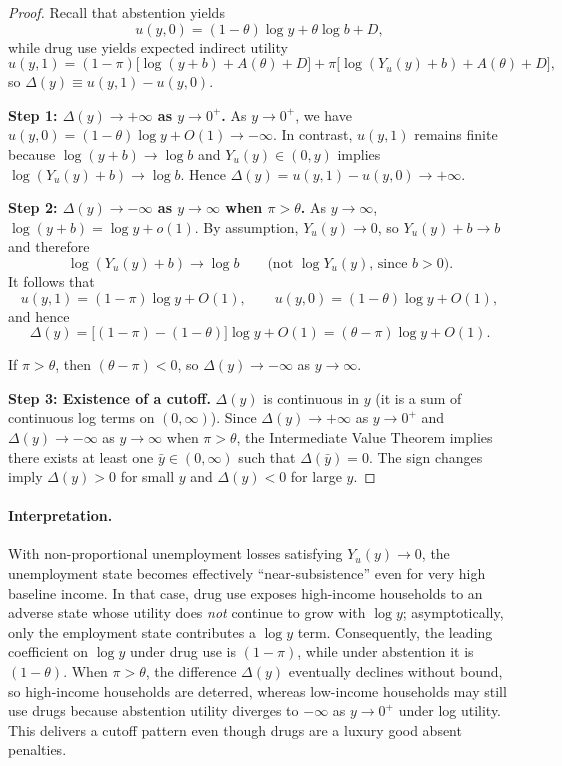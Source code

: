 \documentclass[parskip=full]{article}
\theoremstyle{plain}      %
\theoremstyle{remark}    %
\begin{document}
\begin{proof}
Recall that abstention yields
\[u(y,0)=(1-\theta)\log y+\theta\log b + D,\]
while drug use yields expected indirect utility
\[u(y,1)=(1-\pi)\big[\log(y+b)+A(\theta)+D\big] +\pi\big[\log(Y_u(y)+b)+A(\theta)+D\big],\]
so $\Delta(y)\equiv u(y,1)-u(y,0)$.

\smallskip
\noindent\textbf{Step 1: $\Delta(y)\to +\infty$ as $y\to 0^+$.}
As $y\to 0^+$, we have $u(y,0)=(1-\theta)\log y + O(1)\to -\infty$.
In contrast, $u(y,1)$ remains finite because $\log(y+b)\to\log b$ and $Y_u(y)\in(0,y)$ implies
$\log(Y_u(y)+b)\to \log b$. Hence $\Delta(y)=u(y,1)-u(y,0)\to +\infty$.

\smallskip
\noindent\textbf{Step 2: $\Delta(y)\to -\infty$ as $y\to\infty$ when $\pi>\theta$.}
As $y\to\infty$, $\log(y+b)=\log y+o(1)$.
By assumption, $Y_u(y)\to 0$, so $Y_u(y)+b\to b$ and therefore
\[\log(Y_u(y)+b)\to \log b \qquad \text{(not $\log Y_u(y)$, since $b>0$).}\]
It follows that
\[u(y,1)=(1-\pi)\log y + O(1), \qquad u(y,0)=(1-\theta)\log y + O(1),\]
and hence
\[\Delta(y)=\big[(1-\pi)-(1-\theta)\big]\log y + O(1)=(\theta-\pi)\log y + O(1).\]

If $\pi>\theta$, then $(\theta-\pi)<0$, so $\Delta(y)\to -\infty$ as $y\to\infty$.

\smallskip
\noindent\textbf{Step 3: Existence of a cutoff.}
$\Delta(y)$ is continuous in $y$ (it is a sum of continuous log terms on $(0,\infty)$). Since $\Delta(y)\to +\infty$ as $y\to 0^+$ and $\Delta(y)\to -\infty$ as $y\to\infty$ when $\pi>\theta$, the Intermediate Value Theorem implies there exists at least one $\bar y\in(0,\infty)$ such that $\Delta(\bar y)=0$. The sign changes imply $\Delta(y)>0$ for small $y$ and $\Delta(y)<0$ for large $y$.
\end{proof}

\paragraph{Interpretation.}
With non-proportional unemployment losses satisfying $Y_u(y)\to 0$, the unemployment state becomes effectively ``near-subsistence'' even for very high baseline income. In that case, drug use exposes high-income households
to an adverse state whose utility does \emph{not} continue to grow with $\log y$; asymptotically, only the employment state contributes a $\log y$ term. Consequently, the leading coefficient on $\log y$ under drug use is $(1-\pi)$, while under abstention it is $(1-\theta)$. When $\pi>\theta$, the difference $\Delta(y)$ eventually declines without bound, so high-income households are deterred, whereas low-income households may still use drugs because abstention utility diverges to $-\infty$ as $y\to 0^+$ under log utility. This delivers a cutoff pattern even though drugs are a luxury good absent penalties.
\end{document}
